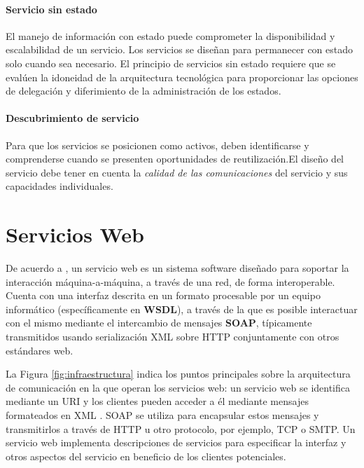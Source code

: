  	 	
 	 \paragraph{Servicio sin estado}
 	  	 
 	 	El manejo de información con estado  puede comprometer la disponibilidad y escalabilidad de un servicio. Los servicios se diseñan para permanecer con estado solo cuando sea necesario. 
 	 	El principio de servicios \gls{sin estado} requiere que se evalúen la idoneidad de la arquitectura tecnológica para proporcionar las opciones de delegación y diferimiento de la administración de los estados.  
 	  
 	 \paragraph{Descubrimiento de servicio}
  
 	  Para que los servicios se posicionen como activos, deben identificarse y comprenderse cuando se presenten oportunidades de reutilización.El diseño del servicio debe tener en cuenta la \textit{\textit{calidad de las comunicaciones}} del servicio y sus capacidades individuales. 
 	  
 
 
  \section{Servicios Web}
   
   De acuerdo a \cite{W3C2022}, un \gls{servicio web} es un sistema software diseñado para soportar la interacción máquina-a-máquina, a través de una red, de forma interoperable. Cuenta con una interfaz descrita en un formato procesable por un equipo informático (específicamente en \textbf{WSDL}), a través de la que es posible interactuar con el mismo mediante el intercambio de mensajes \textbf{SOAP}, típicamente transmitidos usando serialización XML sobre HTTP conjuntamente con otros estándares web.
   
   La Figura \ref{fig:infraestructura} indica los puntos principales sobre la arquitectura de comunicación en la que operan los servicios web: un servicio web se identifica mediante un URI y los clientes pueden acceder a él mediante mensajes formateados en XML \cite{Coulouris2011}.    
   SOAP se utiliza para encapsular estos mensajes y transmitirlos a través de HTTP u otro protocolo, por ejemplo, TCP o SMTP. Un servicio web implementa descripciones de servicios para especificar la interfaz y otros aspectos del servicio en beneficio de los clientes potenciales.
    	
